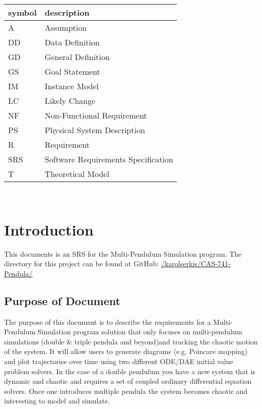 \documentclass[12pt]{article}
\newcommand{\progname}{Multi-Pendulum Simulation }
\begin{document}
\renewcommand{\arraystretch}{1.2}
\begin{tabular}{l l} 
  \toprule		
  \textbf{symbol} & \textbf{description}\\
  \midrule 
  A & Assumption\\
  DD & Data Definition\\
  GD & General Definition\\
  GS & Goal Statement\\
  IM & Instance Model\\
  LC & Likely Change\\
  NF & Non-Functional Requirement\\
  PS & Physical System Description\\
  R & Requirement\\
  SRS & Software Requirements Specification\\
  T & Theoretical Model\\
  \bottomrule
\end{tabular}\\

\newpage


\setcounter{secnumdepth}{3}

\section{Introduction}

This documents is an SRS for the \progname program. The directory for this
project can
be found at GitHub:
\href{https://github.com/karolserkis/CAS-741-Pendula/}{/karolserkis/CAS-741-Pendula/}

\subsection{Purpose of Document}
The purpose of this document is to describe the requirements for a
\progname program solution that
only focuses on multi-pendulum simulations (double \& triple pendula and beyond)and tracking the chaotic
motion of the system. It will allow users to generate diagrams (e.g. Poincare
mapping)
and plot trajectories over time using two different ODE/DAE initial value
problem solvers. In the case of
a double pendulum you have a new system that is dynamic and chaotic and
requires a set of coupled ordinary differential equation solvers. Once one
introduces
multiple
pendula the system becomes chaotic and interesting to model and simulate. 
\end{document}
